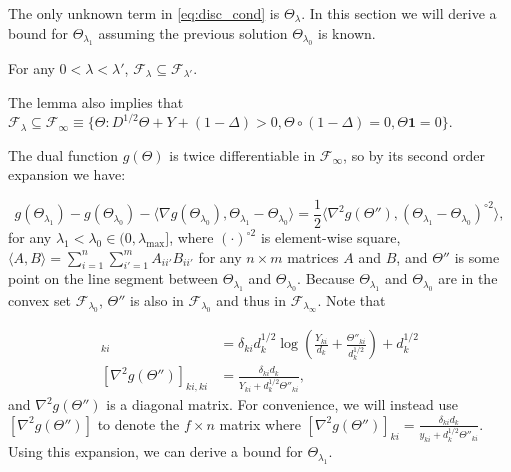 
The only unknown term in \eqref{eq:disc_cond} is $\Theta_{\lambda}$. In this section we will derive a bound for $\Theta_{\lambda_1}$ assuming the previous solution $\Theta_{\lambda_{0}}$ is known.

\begin{lemma}
    \label{lem:1}
    For any $0<\lambda<\lambda'$, $\mathcal{F}_{\lambda}\subseteq\mathcal{F}_{\lambda'}$.
\end{lemma}

The lemma also implies that $\mathcal{F}_{\lambda}\subseteq\mathcal{F}_{\infty}\equiv\{\Theta: D^{1/2}\Theta+Y+(1-\Delta)> 0,\Theta\circ(1-\Delta)=0, \Theta\mathbf{1}=0\}$.

The dual function $g(\Theta)$ is twice differentiable in $\mathcal{F}_{\infty}$, so by its second order expansion we have:

\begin{equation}
        \label{eq:expand}
        g(\Theta_{\lambda_1})-g(\Theta_{\lambda_{0}})-\langle\nabla g(\Theta_{\lambda_{0}}),\Theta_{\lambda_{1}}-\Theta_{\lambda_{0}}\rangle=\frac{1}{2}\langle\nabla^2 g(\Theta''),(\Theta_{\lambda_{1}}-\Theta_{\lambda_{0}})^{\circ 2}\rangle,%
\end{equation}
for any $\lambda_1<\lambda_{0}\in (0,\lambda_\textrm{max}]$, where $(\cdot)^{\circ2}$ is element-wise square, $\langle A,B\rangle=\sum_{i=1}^n\sum_{i'=1}^mA_{ii'}B_{ii'}$ for any $n\times m$ matrices $A$ and $B$, and $\Theta''$ is some point on the line segment between $\Theta_{\lambda_{1}}$ and $\Theta_{\lambda_{0}}$. Because $\Theta_{\lambda_{1}}$ and $\Theta_{\lambda_{0}}$ are in the convex set $\mathcal{F}_{\lambda_{0}}$, $\Theta''$ is also in $\mathcal{F}_{\lambda_{0}}$ and thus in $\mathcal{F}_{\lambda_{\infty}}$. Note that

\begin{align*}
  [\nabla g(\Theta'')]_{ki} &= \delta_{ki}d_k^{1/2}\log\left(\frac{Y_{ki}}{d_k}+\frac{\Theta''_{ki}}{d_k^{1/2}}\right)+d_k^{1/2} \\
  [\nabla^2 g(\Theta'')]_{ki,ki} &= \frac{\delta_{ki}d_k}{Y_{ki}+d_k^{1/2}\Theta''_{ki}},
\end{align*}
and $\nabla^2 g(\Theta'')$ is a diagonal matrix. For convenience, we will instead use $[\nabla^2 g(\Theta'')]$ to denote the $f\times n$ matrix where $[\nabla^2 g(\Theta'')]_{ki}=\frac{\delta_{ki}d_k}{y_{ki}+d_k^{1/2}\Theta''_{ki}}$. Using this expansion, we can derive a bound for $\Theta_{\lambda_1}$.

